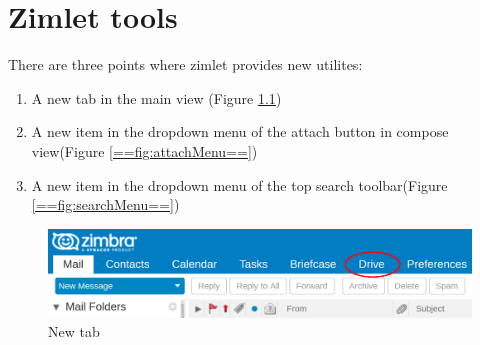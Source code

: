 \chapter{Zimlet tools}

There are three points where zimlet provides new utilites:
\begin{enumerate}
    \item{A new tab in the main view (Figure \ref{==fig:appTab==})}
    \item{A new item in the dropdown menu of the attach button in compose view(Figure \ref{==fig:attachMenu==})}
    \item{A new item in the dropdown menu of the top search toolbar(Figure \ref{==fig:searchMenu==})}
\end{enumerate}

\begin{figure}[htbp,!h] 
\centering 
\includegraphics[scale=0.2]{src/images/ZD-appTabs.png} 
\caption{New tab} 
\label{==fig:appTab==}
\end{figure}
